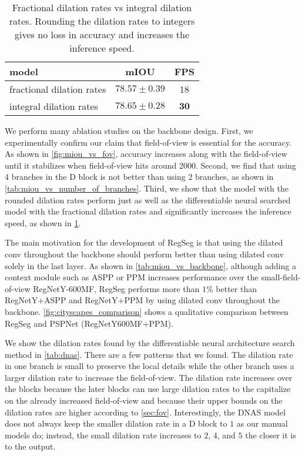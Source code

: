 \documentclass[10pt,twocolumn,letterpaper]{article}
\begin{document}
\begin{table}
  \centering
  \begin{tabular}{l|c|c}
    \toprule
    model & mIOU & FPS\\
    \midrule
    fractional dilation rates & $78.57\pm 0.39$ & 18\\
    integral dilation rates & $78.65 \pm 0.28$& $\mathbf{30}$\\
    \bottomrule
  \end{tabular}
  \caption{Fractional dilation rates vs integral dilation rates. Rounding the dilation rates to integers gives no loss in accuracy and increases the inference speed.}
  \label{tab:fractional_vs_integral}
\end{table}
We perform many ablation studies on the backbone design. First, we experimentally confirm our claim that field-of-view is essential for the accuracy. As shown in \cref{fig:miou_vs_fov}, accuracy increases along with the field-of-view until it stabilizes when field-of-view hits around 2000. Second, we find that using 4 branches in the D block is not better than using 2 branches, as shown in \cref{tab:miou_vs_number_of_branches}. Third, we show that the model with the rounded dilation rates perform just as well as the differentiable neural searched model with the fractional dilation rates and significantly increases the inference speed, as shown in \cref{tab:fractional_vs_integral}.

The main motivation for the development of RegSeg is that using the dilated conv throughout the backbone should perform better than using dilated conv solely in the last layer. As shown in \cref{tab:miou_vs_backbone}, although adding a context module such as ASPP\cite{deeplabv3} or PPM\cite{pspnet} increases performance over the small-field-of-view RegNetY-600MF, RegSeg performs more than $1\%$ better than RegNetY+ASPP and RegNetY+PPM by using dilated conv throughout the backbone. \cref{fig:cityscapes_comparison} shows a qualitative comparison between RegSeg and PSPNet (RegNetY600MF+PPM).

We show the dilation rates found by the differentiable neural architecture search method in \cref{tab:dnas}. There are a few patterns that we found. The dilation rate in one branch is small to preserve the local details while the other branch uses a larger dilation rate to increase the field-of-view. The dilation rate increases over the blocks because the later blocks can use large dilation rates to the capitalize on the already increased field-of-view and because their upper bounds on the dilation rates are higher according to \cref{sec:fov}. Interestingly, the DNAS model does not always keep the smaller dilation rate in a D block to $1$ as our manual models do; instead, the small dilation rate increases to $2$, $4$, and $5$ the closer it is to the output.
\end{document}
